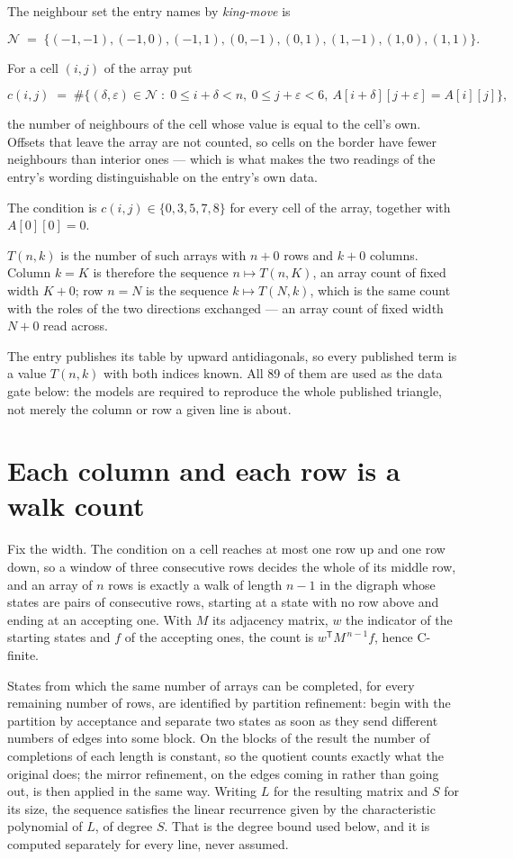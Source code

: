 \documentclass[11pt]{article}
\theoremstyle{definition}
\begin{document}
The neighbour set the entry names by {\itshape king-move} is

\[\mathcal{N} \;=\; \{(-1,-1), (-1,0), (-1,1), (0,-1), (0,1), (1,-1), (1,0), (1,1)\}.\]

For a cell $(i,j)$ of the array put

\[c(i,j) \;=\; \#\bigl\{(\delta,\varepsilon)\in\mathcal{N} \;:\; 0\le i+\delta<n,\ 0\le j+\varepsilon<6,\ A[i+\delta][j+\varepsilon] = A[i][j]\bigr\},\]

the number of neighbours of the cell whose value is equal to the cell's own. Offsets that leave the array are not counted, so cells on the border have fewer neighbours than interior ones --- which is what makes the two readings of the entry's wording distinguishable on the entry's own data.

The condition is $c(i,j) \in \{0, 3, 5, 7, 8\}$ for every cell of the array, together with $A[0][0]=0$.

$T(n,k)$ is the number of such arrays with $n + 0$ rows and $k + 0$ columns. Column $k = K$ is therefore the sequence $n \mapsto T(n,K)$, an array count of fixed width $K + 0$; row $n = N$ is the sequence $k \mapsto T(N,k)$, which is the same count with the roles of the two directions exchanged --- an array count of fixed width $N + 0$ read across.

The entry publishes its table by upward antidiagonals, so every published term is a value $T(n,k)$ with both indices known. All 89 of them are used as the data gate below: the models are required to reproduce the whole published triangle, not merely the column or row a given line is about.

\section{Each column and each row is a walk count}

Fix the width. The condition on a cell reaches at most one row up and one row down, so a window of three consecutive rows decides the whole of its middle row, and an array of $n$ rows is exactly a walk of length $n-1$ in the digraph whose states are pairs of consecutive rows, starting at a state with no row above and ending at an accepting one. With $M$ its adjacency matrix, $w$ the indicator of the starting states and $f$ of the accepting ones, the count is $w^{\mathsf T}M^{\,n-1}f$, hence C-finite.

States from which the same number of arrays can be completed, for every remaining number of rows, are identified by partition refinement: begin with the partition by acceptance and separate two states as soon as they send different numbers of edges into some block. On the blocks of the result the number of completions of each length is constant, so the quotient counts exactly what the original does; the mirror refinement, on the edges coming in rather than going out, is then applied in the same way. Writing $L$ for the resulting matrix and $S$ for its size, the sequence satisfies the linear recurrence given by the characteristic polynomial of $L$, of degree $S$. That is the degree bound used below, and it is computed separately for every line, never assumed.
\end{document}
